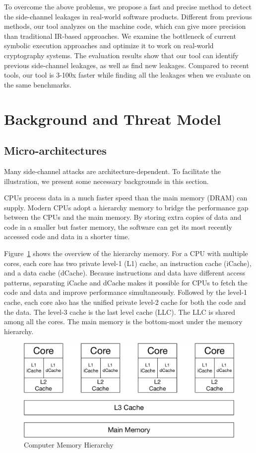 To overcome the above problems, we propose a fast and precise method to detect the side-channel leakages in real-world software products. Different from previous methods, our tool analyzes on the machine code, which can give more precision than traditional IR-based approaches.  We examine the bottleneck of current symbolic execution approaches and optimize it to work on real-world cryptography systems. The evaluation results show that our tool can identify previous side-channel leakages, as well as find new leakages. Compared to recent tools, our tool is 3-100x faster while finding all the leakages when we evaluate on the same benchmarks.

\section{Background and Threat Model}
\subsection{Micro-architectures}
Many side-channel attacks are architecture-dependent. To facilitate the illustration, we present some necessary backgrounds in this section.

CPUs process data in a much faster speed than the main memory (DRAM) can supply. Modern CPUs adopt a hierarchy memory to bridge the performance gap between the CPUs and the main memory. By storing extra copies of data and code in a smaller but faster memory, the software can get its most recently accessed code and data in a shorter time.

Figure~\ref{fig:memory_hierarchy} shows the overview of the hierarchy memory. For a CPU with multiple cores, each core has two private level-1 (L1) cache, an instruction cache (iCache), and a data cache (dCache). Because instructions and data have different access patterns, separating iCache and dCache makes it possible for CPUs to fetch the code and data and improve performance simultaneously. Followed by the level-1 cache, each core also has the unified private level-2 cache for both the code and the data. The level-3 cache is the last level cache (LLC). The LLC is shared among all the cores. The main memory is the bottom-most under the memory hierarchy.
\begin{figure}
  \centering
  \includegraphics[width=.65\columnwidth]{./figures/chapter3/architecture.pdf}
  \caption{Computer Memory Hierarchy}\label{fig:memory_hierarchy}
\end{figure}

